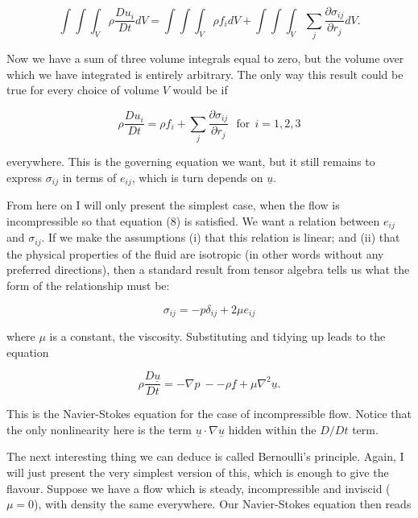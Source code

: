   \begin{equation*}\int{\int{\int_V{\rho \dfrac{Du_i}{Dt} 
  dV}}}=\int{\int{\int_V{\rho f_i dV}}}+\int{\int{\int_V{\sum_j{\dfrac{\partial 
  \sigma_{ij}}{\partial r_j} dV }}}} . \tag{19}\end{equation*} 

  Now we have a sum of three volume integrals equal to zero, but the volume 
  over which we have integrated is entirely arbitrary. The only way this result 
  could be true for every choice of volume $V$ would be if 

  \begin{equation*}\rho \dfrac{Du_i}{Dt}=\rho f_i+\sum_j{\dfrac{\partial 
  \sigma_{ij}}{\partial r_j}}\mathrm{~~~for~~}i=1,2,3 \tag{20}\end{equation*} 

  \noindent{}everywhere. This is the governing equation we want, but it still 
  remains to express $\sigma_{ij}$ in terms of $e_{ij}$, which is turn depends 
  on $\underline{u}$. 

  From here on I will only present the simplest case, when the flow is 
  incompressible so that equation (8) is satisfied. We want a relation between 
  $e_{ij}$ and $\sigma_{ij}$. If we make the assumptions (i) that this relation 
  is linear; and (ii) that the physical properties of the fluid are isotropic 
  (in other words without any preferred directions), then a standard result 
  from tensor algebra tells us what the form of the relationship must be: 

  \begin{equation*}\sigma_{ij} = -p \delta_{ij} + 2 \mu e_{ij} 
  \tag{21}\end{equation*} 

  \noindent{}where $\mu$ is a constant, the viscosity. Substituting and tidying 
  up leads to the equation 

  \begin{equation*}\rho \dfrac{D \underline{u}}{Dt}= -\nabla p \mathrm{~} -- 
  \rho \underline{f}+\mu \nabla^2 \underline{u}. \tag{22}\end{equation*} 

  This is the Navier-Stokes equation for the case of incompressible flow. 
  Notice that the only nonlinearity here is the term $\underline{u} \cdot 
  \nabla \underline{u}$ hidden within the $D/Dt$ term. 

  The next interesting thing we can deduce is called Bernoulli's principle. 
  Again, I will just present the very simplest version of this, which is enough 
  to give the flavour. Suppose we have a flow which is steady, incompressible 
  and inviscid ($\mu=0$), with density the same everywhere. Our Navier-Stokes 
  equation then reads 


